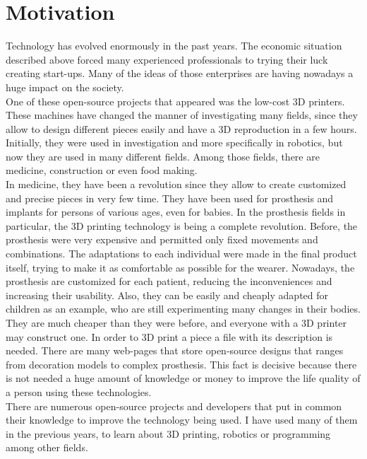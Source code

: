 \section{Motivation}
Technology has evolved enormously in the past years. The economic situation described above forced many experienced professionals to trying their luck creating start-ups. Many of the ideas of those enterprises are having nowadays a huge impact on the society. 
\\

One of these open-source projects that appeared was the low-cost 3D printers. These machines have changed the manner of investigating many fields, since they allow to design different pieces easily and have a 3D reproduction in a few hours. 
\\

Initially, they were used in investigation and more specifically in robotics, but now they are used in many different fields. Among those fields, there are medicine, construction or even food making. 
\\

In medicine, they have been a revolution since they allow to create customized and precise pieces in very few time. They have been used for prosthesis and implants for persons of various ages, even for babies. In the prosthesis fields in particular, the 3D printing technology is being a complete revolution. Before, the prosthesis were very expensive and permitted only fixed movements and combinations. The adaptations to each individual were made in the final product itself, trying to make it as comfortable as possible for the wearer. Nowadays, the prosthesis are customized for each patient, reducing the inconveniences and increasing their usability. Also, they can be easily and cheaply adapted for children as an example, who are still experimenting many changes in their bodies. They are much cheaper than they were before, and everyone with a 3D printer may construct one. 
In order to 3D print a piece a file with its description is needed. There are many web-pages that store open-source designs that ranges from decoration models to complex prosthesis. This fact is decisive because there is not needed a huge amount of knowledge or money to improve the life quality of a person using these technologies. 
\\

There are numerous open-source projects and developers that put in common their knowledge to improve the technology being used. I have used many of them in the previous years, to learn about 3D printing, robotics or programming among other fields. 
\\

